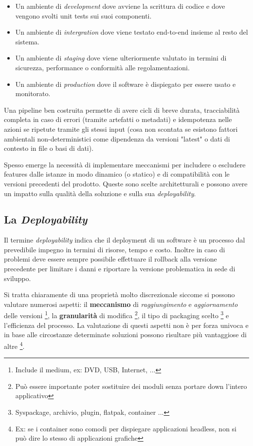 \documentclass[a4paper,11pt,oneside, table]{article}
\begin{document}
  \begin{itemize}
    \item Un ambiente di \textit{development} dove avviene la scrittura di codice e dove vengono svolti unit tests sui suoi componenti.
    \item Un ambiente di \textit{intergration} dove viene testato end-to-end insieme al resto del sistema.
    \item Un ambiente di \textit{staging} dove viene ulteriormente valutato in termini di sicurezza, performance o conformit\`a alle regolamentazioni.
    \item Un ambiente di \textit{production} dove il software \`e dispiegato per essere usato e monitorato.
  \end{itemize}

  Una pipeline ben costruita permette di avere cicli di breve durata, tracciabilit\`a completa in caso di errori (tramite artefatti o metadati) e idempotenza nelle azioni se ripetute tramite gli stessi input (cosa non scontata se esistono fattori ambientali non-deterministici come dipendenza da versioni "latest" o dati di contesto in file o basi di dati).

  Spesso emerge la necessit\`a di implementare meccanismi per includere o escludere features dalle istanze in modo dinamico (o statico) e di compatibilit\`a con le versioni precedenti del prodotto. Queste sono scelte architetturali e possono avere un impatto sulla qualit\`a della soluzione e sulla sua \textit{deployability}.

  \subsection{La \textit{Deployability}}

  Il termine \textit{deployability} indica che il deployment di un software \`e un processo dal prevedibile impegno in termini di risorse, tempo e costo. Inoltre in caso di problemi deve essere sempre possibile effettuare il rollback alla versione precedente per limitare i danni e riportare la versione problematica in sede di sviluppo.

  Si tratta chiaramente di una propriet\`a molto discrezionale siccome si possono valutare numerosi aspetti: il \textbf{meccanismo} di \textit{raggiungimento} e \textit{aggiornamento} delle versioni \footnote{Include il medium, ex: DVD, USB, Internet, ...}, la \textbf{granularit\`a} di modifica \footnote{Pu\`o essere importante poter sostituire dei moduli senza portare down l'intero applicativo}, il tipo di packaging scelto \footnote{Syspackage, archivio, plugin, flatpak, container ...} e l'efficienza del processo. La valutazione di questi aspetti non \`e per forza univoca e in base alle circostanze determinate soluzioni possono risultare pi\`u vantaggiose di altre \footnote{Ex: se i container sono comodi per dispiegare applicazioni headless, non si pu\`o dire lo stesso di applicazioni grafiche}.
\end{document}
